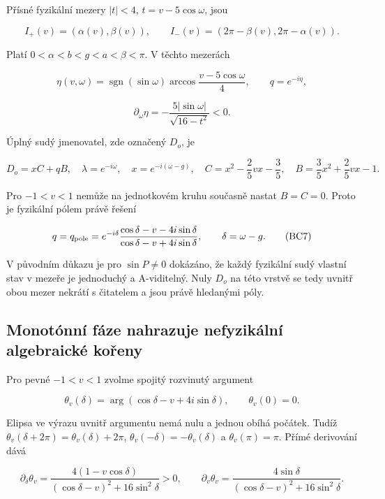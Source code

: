 \documentclass[11pt,a4paper]{article}
\theoremstyle{remark}\newtheorem{remark}[theorem]{Poznámka}
\numberwithin{equation}{section}
\begin{document}
Přísné fyzikální mezery \(|t|<4\), \(t=v-5\cos\omega\), jsou

\[
I_+(v)=(\alpha(v),\beta(v)),\qquad
I_-(v)=(2\pi-\beta(v),2\pi-\alpha(v)).
\tag{BC3}
\]

Platí \(0<\alpha<b<g<a<\beta<\pi\). V těchto mezerách

\[
\eta(v,\omega)=\operatorname{sgn}(\sin\omega)
\arccos\frac{v-5\cos\omega}{4},\qquad q=e^{-i\eta},
\tag{BC4}
\]

\[
\partial_\omega\eta
=-\frac{5|\sin\omega|}{\sqrt{16-t^2}}<0.
\tag{BC5}
\]

Úplný sudý jmenovatel, zde označený \(D_o\), je

\[
D_o=xC+qB,
\quad \lambda=e^{-i\omega},\quad x=e^{-i(\omega-g)},
\quad C=x^2-\frac25vx-\frac35,
\quad B=\frac35x^2+\frac25vx-1.
\tag{BC6}
\]

Pro \(-1<v<1\) nemůže na jednotkovém kruhu současně nastat \(B=C=0\).
Proto je fyzikální pólem právě řešení

\[
q=q_{\rm pole}
=e^{-i\delta}\frac{\cos\delta-v-4i\sin\delta}
                         {\cos\delta-v+4i\sin\delta},
\qquad \delta=\omega-g.
\tag{BC7}
\]

V původním důkazu je pro \(\sin P\ne0\) dokázáno, že každý fyzikální
sudý vlastní stav v mezeře je jednoduchý a A-viditelný. Nuly \(D_o\) na
této vrstvě se tedy uvnitř obou mezer nekrátí s čitatelem a jsou právě
hledanými póly.

\hypertarget{monotuxf3nnuxed-fuxe1ze-nahrazuje-nefyzikuxe1lnuxed-algebraickuxe9-koux159eny}{%
\subsection{Monotónní fáze nahrazuje nefyzikální algebraické
kořeny}\label{monotuxf3nnuxed-fuxe1ze-nahrazuje-nefyzikuxe1lnuxed-algebraickuxe9-koux159eny}}

Pro pevné \(-1<v<1\) zvolme spojitý rozvinutý argument

\[
\theta_v(\delta)
=\arg(\cos\delta-v+4i\sin\delta),\qquad \theta_v(0)=0.
\tag{BC8}
\]

Elipsa ve výrazu uvnitř argumentu nemá nulu a jednou obíhá počátek.
Tudíž \(\theta_v(\delta+2\pi)=\theta_v(\delta)+2\pi\),
\(\theta_v(-\delta)=-\theta_v(\delta)\) a \(\theta_v(\pi)=\pi\). Přímé
derivování dává

\[
\partial_\delta\theta_v
=\frac{4(1-v\cos\delta)}
       {(\cos\delta-v)^2+16\sin^2\delta}>0,
\qquad
\partial_v\theta_v
=\frac{4\sin\delta}
       {(\cos\delta-v)^2+16\sin^2\delta}.
\tag{BC9}
\]
\end{document}
